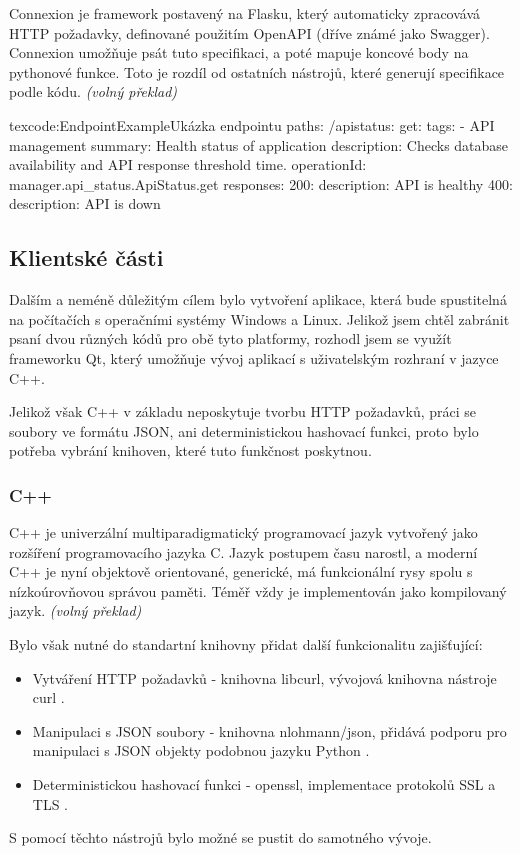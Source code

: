 \documentclass[
  glossaries,
]{kidiplom}
\begin{document}
Connexion je framework postavený na Flasku, který automaticky zpracovává HTTP požadavky, definované použitím OpenAPI (dříve známé jako Swagger). Connexion umožňuje psát tuto specifikaci, a poté mapuje koncové body na pythonové funkce. Toto je rozdíl od ostatních nástrojů, které generují specifikace podle kódu. \cite{CONNEXION} \textit {(volný překlad)}


\begin{kicode}{tex}{code:EndpointExample}{Ukázka endpointu}
paths:
  /apistatus:
    get:
      tags: 
        - API management
      summary: Health status of application
      description: Checks database availability and API response threshold time.
      operationId: manager.api_status.ApiStatus.get
      responses:
        200:
          description: API is healthy
        400:
          description: API is down
\end{kicode}

\subsection{Klientské části}
Dalším a neméně důležitým cílem bylo vytvoření aplikace, která bude spustitelná na počítačích s operačními systémy Windows a Linux. Jelikož jsem chtěl zabránit psaní dvou různých kódů pro obě tyto platformy, rozhodl jsem se využít frameworku Qt, který umožňuje vývoj aplikací s uživatelským rozhraní v jazyce C++.

Jelikož však C++ v základu neposkytuje tvorbu HTTP požadavků, práci se soubory ve formátu JSON, ani deterministickou hashovací funkci, proto bylo potřeba vybrání knihoven, které tuto funkčnost poskytnou.

\subsubsection{C++}
C++ je univerzální multiparadigmatický programovací jazyk vytvořený jako rozšíření programovacího jazyka C. Jazyk postupem času narostl, a moderní C++ je nyní objektově orientované, generické, má funkcionální rysy spolu s nízkoúrovňovou správou paměti. Téměř vždy je implementován jako kompilovaný jazyk. \cite{C++} \textit {(volný překlad)}


Bylo však nutné do standartní knihovny přidat další funkcionalitu zajišťující:
\begin{itemize}
\item Vytváření HTTP požadavků - knihovna libcurl, vývojová knihovna nástroje curl \cite{LIBCURL}.
\item Manipulaci s JSON soubory - knihovna nlohmann/json, přidává podporu pro manipulaci s JSON objekty podobnou jazyku Python \cite{JSONCPP}.
\item Deterministickou hashovací funkci - openssl, implementace protokolů SSL a TLS \cite{OPENSSL}.
\end{itemize}
S pomocí těchto nástrojů bylo možné se pustit do samotného vývoje.
\end{document}
